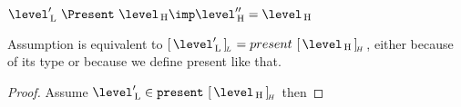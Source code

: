 %
%
%
%
%
%
%




$\level'\L~\Present~\level\H \imp \level''\H = \level\H $

Assumption is equivalent to $\eqcl{\level'\L}{L} = present~\eqcl{\level\H}{H}$, either because of its type or because we define present like that.

\begin{proof} Assume $\level'\L \in \present~\eqcl{\level\H}{H}$ then
\end{proof}


